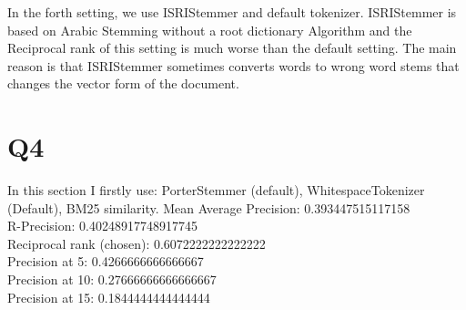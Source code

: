 \documentclass{article}
\begin{document}
In the forth setting, we use ISRIStemmer and default tokenizer. ISRIStemmer is
based on Arabic Stemming without a root dictionary Algorithm and the Reciprocal 
rank of this setting is much worse than the default setting. The main reason is 
that ISRIStemmer sometimes converts words to wrong word stems that changes the 
vector form of the document.\\

\section*{Q4}
In this section I firstly use:
PorterStemmer (default), WhitespaceTokenizer (Default), BM25 similarity.
Mean Average Precision: 0.393447515117158\\
R-Precision: 0.40248917748917745\\
Reciprocal rank (chosen): 0.6072222222222222\\
Precision at 5: 0.4266666666666667\\
Precision at 10: 0.27666666666666667\\
Precision at 15: 0.1844444444444444\\
\end{document}
